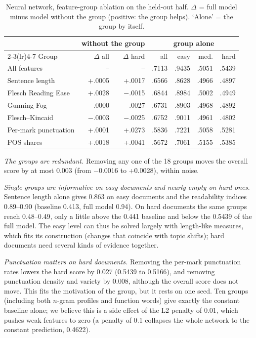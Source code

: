 \documentclass[runningheads]{llncs}
\begin{document}
\begin{table}[t]
\caption{Neural network, feature-group ablation on the held-out half. $\Delta$ = full model minus model without the group (positive: the group helps). `Alone' = the group by itself.}
\label{tab:abl}
\centering
\setlength{\tabcolsep}{3.5pt}
\footnotesize
\begin{tabular}{lrrrrrr}
\toprule
 & \multicolumn{2}{c}{without the group} & \multicolumn{4}{c}{group alone}\\
\cmidrule(lr){2-3}\cmidrule(lr){4-7}
Group & $\Delta$ all & $\Delta$ hard & all & easy & med. & hard\\
\midrule
All features & -- & -- & .7113 & .9435 & .5051 & .5439\\
Sentence length & +.0005 & +.0017 & .6566 & .8628 & .4966 & .4897\\
Flesch Reading Ease & +.0028 & $-$.0015 & .6844 & .8984 & .5002 & .4949\\
Gunning Fog & .0000 & $-$.0027 & .6731 & .8903 & .4968 & .4892\\
Flesch--Kincaid & $-$.0003 & $-$.0025 & .6752 & .9011 & .4961 & .4802\\
Per-mark punctuation & +.0001 & +.0273 & .5836 & .7221 & .5058 & .5281\\
POS shares & +.0018 & +.0041 & .5672 & .7061 & .5155 & .5385\\
\bottomrule
\end{tabular}
\end{table}

\emph{The groups are redundant.} Removing any one of the 18 groups moves the overall score by at most 0.003 (from $-$0.0016 to +0.0028), within noise.

\emph{Single groups are informative on easy documents and nearly empty on hard ones.} Sentence length alone gives 0.863 on easy documents and the readability indices 0.89--0.90 (baseline 0.413, full model 0.94). On hard documents the same groups reach 0.48--0.49, only a little above the 0.441 baseline and below the 0.5439 of the full model. The easy level can thus be solved largely with length-like measures, which fits its construction (changes that coincide with topic shifts); hard documents need several kinds of evidence together.

\emph{Punctuation matters on hard documents.} Removing the per-mark punctuation rates lowers the hard score by 0.027 (0.5439 to 0.5166), and removing punctuation density and variety by 0.008, although the overall score does not move. This fits the motivation of the group, but it rests on one seed. Ten groups (including both $n$-gram profiles and function words) give exactly the constant baseline alone; we believe this is a side effect of the L2 penalty of 0.01, which pushes weak features to zero (a penalty of 0.1 collapses the whole network to the constant prediction, 0.4622).
\end{document}
